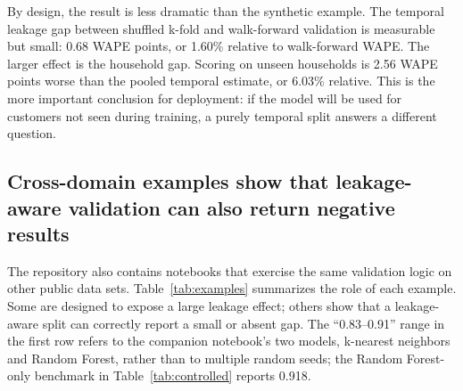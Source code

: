 \documentclass[10pt]{article}
\begin{document}
By design, the result is less dramatic than the synthetic example. The temporal
leakage gap between shuffled k-fold and walk-forward validation is measurable
but small: 0.68 WAPE points, or 1.60\% relative to walk-forward WAPE. The
larger effect is the household gap. Scoring on unseen households is 2.56 WAPE
points worse than the pooled temporal estimate, or 6.03\% relative. This is the
more important conclusion for deployment: if the model will be used for
customers not seen during training, a purely temporal split answers a different
question.

\subsection{Cross-domain examples show that leakage-aware validation can also return negative results}

The repository also contains notebooks that exercise the same validation logic
on other public data sets. Table~\ref{tab:examples} summarizes the role of each
example. Some are designed to expose a large leakage effect; others show that a
leakage-aware split can correctly report a small or absent gap. The
``0.83--0.91'' range in the first row refers to the companion notebook's two
models, k-nearest neighbors and Random Forest, rather than to multiple random
seeds; the Random Forest-only benchmark in Table~\ref{tab:controlled} reports
0.918.
\end{document}
